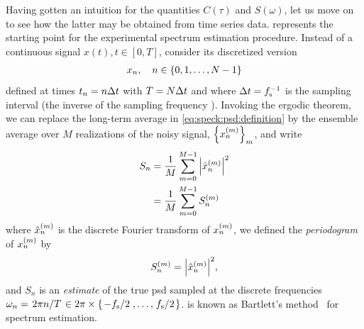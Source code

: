 Having gotten an intuition for the quantities $C(\tau)$ and $S(\omega)$, let us move on to see how the latter may be obtained from time series data.
 represents the starting point for the experimental spectrum estimation procedure.
Instead of a continuous signal $x(t), t\in [0, T]$, consider its discretized version
\begin{align}\label{eq:speck:signal:discrete}
    x_n \qc n\in\lbrace 0, 1, \dotsc, N - 1\rbrace
\end{align}
defined at times $t_n = n\Delta t$ with $T = N\Delta t$ and where $\Delta t = f_{\mathrm{s}}^{-1}$ is the sampling interval (the inverse of the sampling frequency \fs).
Invoking the ergodic theorem,
we can replace the long-term average in \cref{eq:speck:psd:definition} by the ensemble average over $M$ realizations of the noisy signal, $\left\lbrace x_n^{(m)}\right\rbrace_m$, and write
\begin{align}\label{eq:speck:psd:bartlett}
    S_n &= \frac{1}{M} \sum_{m=0}^{M-1} \abs{\hat{x}_n^{(m)}}^2 \\
        &= \frac{1}{M} \sum_{m=0}^{M-1} S_n^{(m)}
\end{align}
where $\hat{x}_n^{(m)}$ is the discrete Fourier transform of $x_n^{(m)}$, we defined the \emph{periodogram} of $x_n^{(m)}$ by
\begin{align}\label{eq:speck:periodogram}
    S_n^{(m)} = \abs{\hat{x}_n^{(m)}}^2,
\end{align}
and $S_n$ is an \emph{estimate} of the true \gls{psd} sampled at the discrete frequencies $\omega_n = \flatfrac{2\pi n}{T} \in 2\pi\times\lbrace\flatfrac{-\fs}{2}, \dotsc, \flatfrac{\fs}{2}\rbrace$.
 is known as Bartlett's method~\cite{Bartlett1948} for spectrum estimation.

